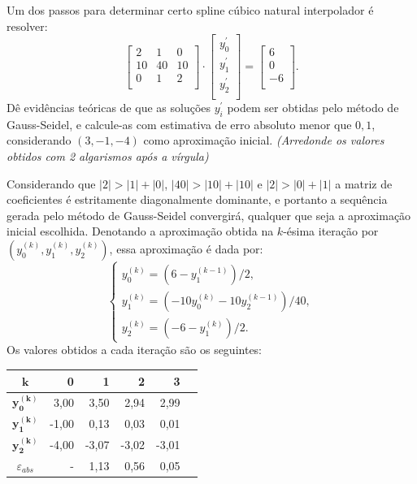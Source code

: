 \documentclass[12pt,a4paper]{article}
\begin{document}
\begin{ExerciseList}
\Exercise[title={2,0}] Um dos passos para determinar certo spline cúbico natural interpolador é resolver:
\[
  \begin{bmatrix}
    2 & 1 & 0 \\
    10 & 40 & 10 \\
    0 & 1 & 2\\
  \end{bmatrix}
  \cdot
  \begin{bmatrix}
    y_0^\prime\\
    y_1^\prime\\
    y_2^\prime\\
  \end{bmatrix}
  =
  \begin{bmatrix}
    6\\
    0\\
    -6\\
  \end{bmatrix}.
\]
Dê evidências teóricas de que as soluções $y_i^\prime$ podem ser obtidas pelo método de Gauss-Seidel, e calcule-as com estimativa de erro absoluto menor que $0,1$, considerando $(3, -1,-4)$ como aproximação inicial.
{\color{blue} \textit{(Arredonde os valores obtidos com 2 algarismos após a vírgula)}}

\Answer Considerando que
$|2| > |1|+|0|$,
$|40| > |10|+|10|$ e
$|2| > |0|+|1|$
a matriz de coeficientes é estritamente diagonalmente dominante, e portanto a sequência gerada pelo método de Gauss-Seidel convergirá, qualquer que seja a aproximação inicial escolhida. Denotando a aproximação obtida na $k$-ésima iteração por $\left(y_0^{(k)}, y_1^{(k)}, y_2^{(k)}\right)$, essa aproximação é dada por:
\[
  \begin{cases}
    y_0^{(k)} = \left(6 - y_1^{(k-1)}\right)/2, \\
    y_1^{(k)} = \left(- 10 y_0^{(k)} - 10y_2^{(k-1)}\right)/40, \\
    y_2^{(k)} = \left(-6 - y_1^{(k)}\right)/2.
    \end{cases}
\]
Os valores obtidos a cada iteração são os seguintes:
\medskip
\begin{center}
\begin{tabular}{crrrrr}
\hline
$\boldsymbol{k}$     & 0 & 1 & 2 & 3\\
\hline
$\boldsymbol{y_0^{(k)}}$ &  3,00 &  3,50 &  2,94 &  2,99 \\
$\boldsymbol{y_1^{(k)}}$ & -1,00 &  0,13 &  0,03 &  0,01 \\
$\boldsymbol{y_2^{(k)}}$ & -4,00 & -3,07 & -3,02 & -3,01 \\
\hline
$\varepsilon_{abs}$ & - & 1,13 & 0,56 & 0,05\\
\hline
\end{tabular}
\end{center}


\end{ExerciseList}
\end{document}
